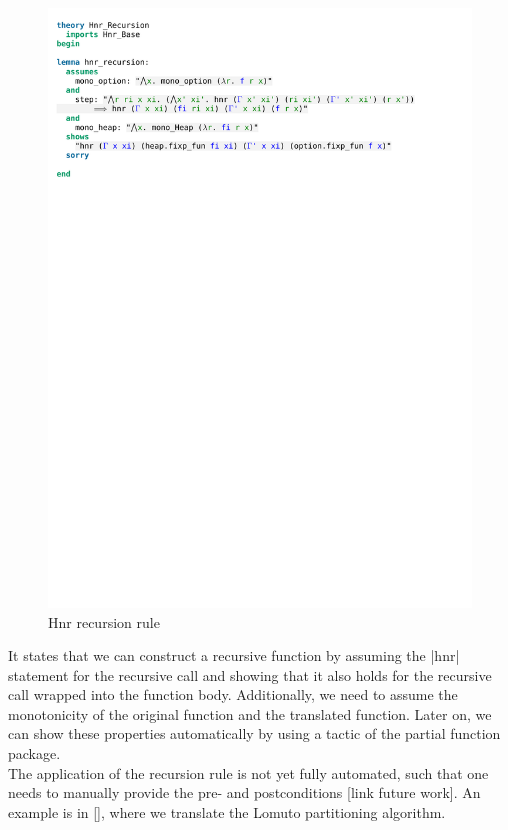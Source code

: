 \begin{figure}[htpb]
    \includegraphics[trim={0 22,6cm 0 2,4cm}, clip, width=1.00\textwidth]{figures/Theory_Hnr_Recursion.pdf}
    \caption[Hnr recursion rule]{Hnr recursion rule}
    \label{fig:hnr_recursion}
\end{figure}

\noindent It states that we can construct a recursive function by assuming the |hnr| statement for the recursive call and showing that it also holds for the recursive call wrapped into the function body. Additionally, we need to assume the monotonicity of the original function and the translated function. Later on, we can show these properties automatically by using a tactic of the partial function package.\\
The application of the recursion rule is not yet fully automated, such that one needs to manually provide the pre- and postconditions [link future work]. An example is in [], where we translate the Lomuto partitioning algorithm.

